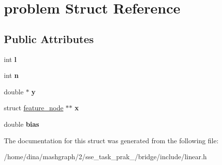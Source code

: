 \hypertarget{structproblem}{\section{problem Struct Reference}
\label{structproblem}
}
\subsection*{Public Attributes}
\begin{DoxyCompactItemize}
\item 
\hypertarget{structproblem_ad8ed4c325cf467c527df09a304f0c62c}{int {\bfseries l}}\label{structproblem_ad8ed4c325cf467c527df09a304f0c62c}

\item 
\hypertarget{structproblem_ac8c7b64eda42bb6dda1090e34bbd5508}{int {\bfseries n}}\label{structproblem_ac8c7b64eda42bb6dda1090e34bbd5508}

\item 
\hypertarget{structproblem_aa5d051d5ffc27dcd85b8037e041381f1}{double $\ast$ {\bfseries y}}\label{structproblem_aa5d051d5ffc27dcd85b8037e041381f1}

\item 
\hypertarget{structproblem_a5093aa1f707126e975abf5eb2892c292}{struct \hyperlink{structfeature__node}{feature\-\_\-node} $\ast$$\ast$ {\bfseries x}}\label{structproblem_a5093aa1f707126e975abf5eb2892c292}

\item 
\hypertarget{structproblem_acda430c8a0b16f59f065fa2da130f0dd}{double {\bfseries bias}}\label{structproblem_acda430c8a0b16f59f065fa2da130f0dd}

\end{DoxyCompactItemize}


The documentation for this struct was generated from the following file\-:\begin{DoxyCompactItemize}
\item 
/home/dina/mashgraph/2/sse\-\_\-task\-\_\-prak\-\_/bridge/include/linear.\-h\end{DoxyCompactItemize}
